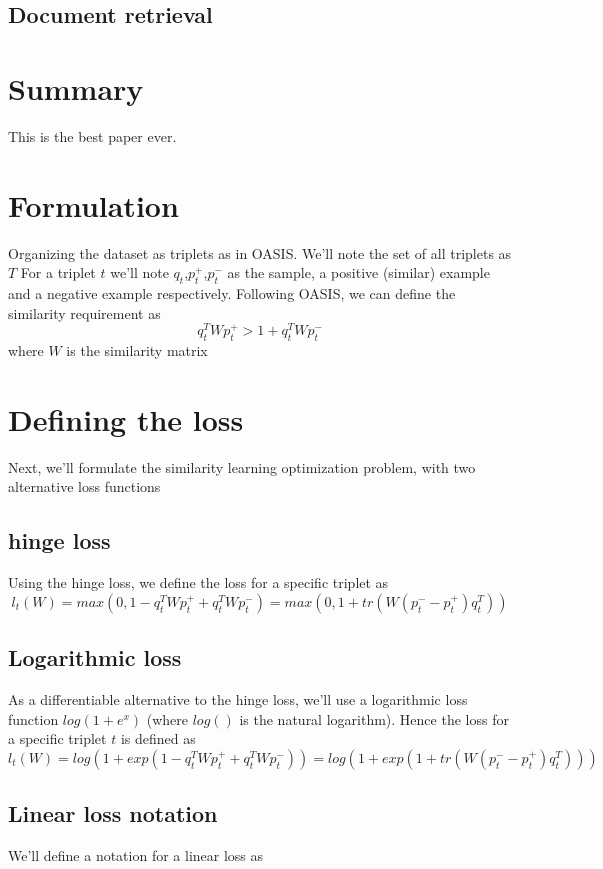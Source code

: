 \documentclass{article}
\begin{document}
\subsection{Document retrieval}


\section{Summary}
This is the best paper ever.



\section{Formulation}
Organizing the dataset as triplets as in OASIS. We’ll note the set of all triplets as $T$ 
For a triplet $t$ we’ll note $q_t$,$p_t^+$,$p_t^-$  as the sample, a positive (similar) example and a negative example respectively. Following OASIS, we can define the similarity requirement as
\begin{equation}
q_t^T Wp_t^+>1+q_t^T Wp_t^-
\end{equation}
where $W$ is the similarity matrix
\section{Defining the loss }
Next, we’ll formulate the similarity learning optimization problem, with two alternative loss functions
\subsection{hinge loss} 
Using the hinge loss, we define the loss for a specific triplet as
\begin{equation}
l_t (W)=max(0,1-q_t^T Wp_t^++q_t^T Wp_t^-)=max(0,1+tr(W(p_t^--p_t^+)q_t^T))
\end{equation}
	
\subsection{Logarithmic loss} 
As a differentiable alternative to the hinge loss, we’ll use a logarithmic loss function  $log(1+e^x)$ (where $log()$ is the natural logarithm). Hence the loss for a specific triplet $t$ is defined as 
\begin{equation}
l_t (W)=log(1+exp(1-q_t^T Wp_t^++q_t^T Wp_t^-))=log(1+exp(1+tr(W(p_t^--p_t^+)q_t^T)))
\end{equation}
\subsection{Linear loss notation} 
We’ll define a notation for  a linear loss as 
\end{document}
